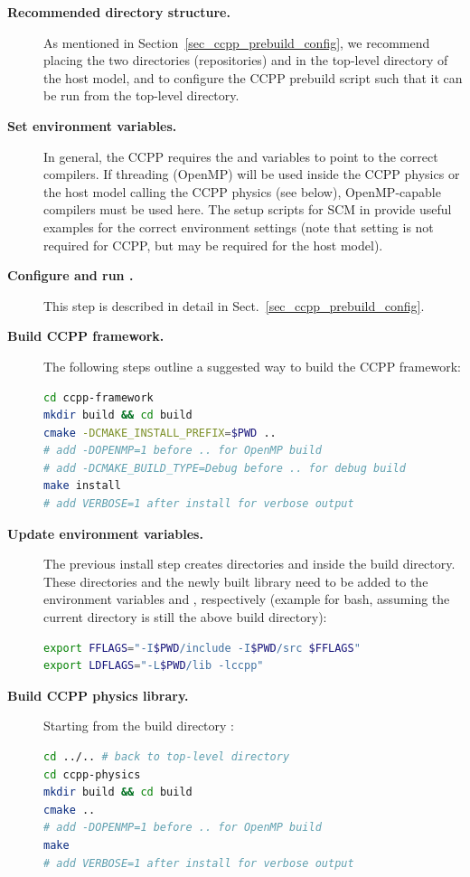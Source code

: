 \begin{description}
\item[\textbf{Recommended directory structure.}] As mentioned in Section~\ref{sec_ccpp_prebuild_config}, we recommend placing the two directories (repositories)  and  in the top-level directory of the host model, and to configure the CCPP prebuild script such that it can be run from the top-level directory.
\item[\textbf{Set environment variables.}] In general, the CCPP requires the  and  variables to point to the correct compilers. If threading (OpenMP) will be used inside the CCPP physics or the host model calling the CCPP physics (see below), OpenMP-capable compilers must be used here. The setup scripts for SCM in  provide useful examples for the correct environment settings (note that setting  is not required for CCPP, but may be required for the host model).
\item[\textbf{Configure and run .}] This step is described in detail in Sect.~\ref{sec_ccpp_prebuild_config}.
\item[\textbf{Build CCPP framework.}] The following steps outline a suggested way to build the CCPP framework:
\begin{lstlisting}[language=bash]
cd ccpp-framework
mkdir build && cd build
cmake -DCMAKE_INSTALL_PREFIX=$PWD ..
# add -DOPENMP=1 before .. for OpenMP build
# add -DCMAKE_BUILD_TYPE=Debug before .. for debug build
make install
# add VERBOSE=1 after install for verbose output
\end{lstlisting}
\item[\textbf{Update environment variables.}] The previous install step creates directories  and  inside the build directory. These directories and the newly built library  need to be added to the environment variables  and , respectively (example for bash, assuming the current directory is still the above build directory):
\begin{lstlisting}[language=bash]
export FFLAGS="-I$PWD/include -I$PWD/src $FFLAGS"
export LDFLAGS="-L$PWD/lib -lccpp"
\end{lstlisting}
\item[\textbf{Build CCPP physics library.}] Starting from the build directory :
\begin{lstlisting}[language=bash]
cd ../.. # back to top-level directory
cd ccpp-physics
mkdir build && cd build
cmake ..
# add -DOPENMP=1 before .. for OpenMP build
make
# add VERBOSE=1 after install for verbose output
\end{lstlisting}
\end{description}
